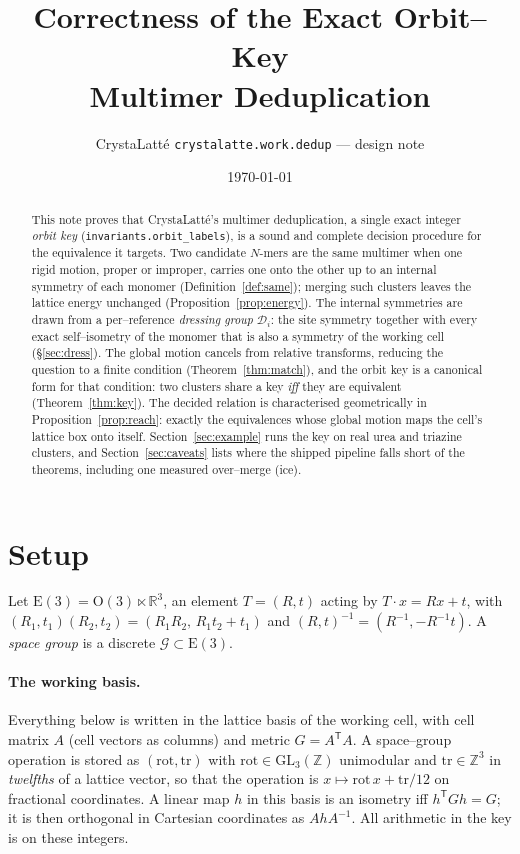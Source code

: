 \documentclass[11pt]{article}
\title{Correctness of the Exact Orbit--Key\\ Multimer Deduplication}
\author{CrystaLatt\'e \texttt{crystalatte.work.dedup} --- design note}
\date{\today}
\theoremstyle{definition}
\newcommand{\Eth}{\mathrm{E}(3)}
\newcommand{\Oth}{\mathrm{O}(3)}
\newcommand{\Grp}{\mathcal{G}}
\newcommand{\Dgrp}{\mathcal{D}}
\newcommand{\inv}{^{-1}}
\begin{document}
\maketitle

\begin{abstract}
This note proves that CrystaLatt\'e's multimer deduplication, a single exact
integer \emph{orbit key} (\texttt{invariants.orbit\_labels}), is a sound and
complete decision procedure for the equivalence it targets. Two candidate
$N$-mers are the same multimer when one rigid motion, proper or improper, carries
one onto the other up to an internal symmetry of each monomer
(Definition~\ref{def:same}); merging such clusters leaves the lattice energy
unchanged (Proposition~\ref{prop:energy}). The internal symmetries are drawn from
a per--reference \emph{dressing group} $\Dgrp_i$: the site symmetry together with
every exact self--isometry of the monomer that is also a symmetry of the working
cell (\S\ref{sec:dress}). The global motion cancels from relative transforms,
reducing the question to a finite condition (Theorem~\ref{thm:match}), and the
orbit key is a canonical form for that condition: two clusters share a key
\emph{iff} they are equivalent (Theorem~\ref{thm:key}). The decided relation is
characterised geometrically in Proposition~\ref{prop:reach}: exactly the
equivalences whose global motion maps the cell's lattice box onto itself.
Section~\ref{sec:example} runs the key on real urea and triazine clusters, and
Section~\ref{sec:caveats} lists where the shipped pipeline falls short of the
theorems, including one measured over--merge (ice).
\end{abstract}

\section{Setup}

Let $\Eth=\Oth\ltimes\mathbb{R}^3$, an element $T=(R,t)$ acting by $T\cdot x=Rx+t$,
with $(R_1,t_1)(R_2,t_2)=(R_1R_2,\,R_1t_2+t_1)$ and $(R,t)\inv=(R\inv,-R\inv t)$.
A \emph{space group} is a discrete $\Grp\subset\Eth$.

\paragraph{The working basis.} Everything below is written in the lattice basis
of the working cell, with cell matrix $A$ (cell vectors as columns) and metric
$G=A^{\mathsf T}A$. A space--group operation is stored as
$(\mathrm{rot},\mathrm{tr})$ with $\mathrm{rot}\in\mathrm{GL}_3(\mathbb{Z})$
unimodular and $\mathrm{tr}\in\mathbb{Z}^3$ in \emph{twelfths} of a lattice
vector, so that the operation is $x\mapsto\mathrm{rot}\,x+\mathrm{tr}/12$ on
fractional coordinates. A linear map $h$ in this basis is an isometry iff
$h^{\mathsf T}Gh=G$; it is then orthogonal in Cartesian coordinates as
$AhA\inv$. All arithmetic in the key is on these integers.
\end{document}
